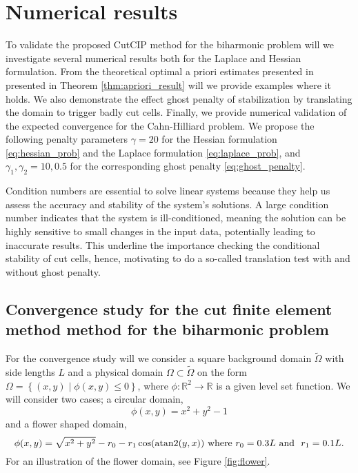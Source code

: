 
\newpage
\section{Numerical results}%
\label{sec:numerical_results}


To validate the proposed CutCIP method for the biharmonic problem will we investigate several numerical results both for the Laplace and Hessian formulation. From the theoretical optimal a priori estimates presented in presented in Theorem \ref{thm:apriori_result} will we provide examples where it holds. We also demonstrate the effect ghost penalty of stabilization by translating the domain to trigger badly cut cells. Finally, we provide numerical validation of the expected convergence for
the Cahn-Hilliard problem. We propose the following penalty parameters $\gamma = 20$ for the Hessian formulation \eqref{eq:hessian_prob} and the Laplace formulation \eqref{eq:laplace_prob}, and $\gamma _{1}, \gamma _{2} = 10, 0.5$ for the
corresponding ghost penalty \eqref{eq:ghost_penalty}.

Condition numbers are essential to solve linear systems because they help us assess the accuracy and stability of the system's solutions. A large condition number indicates that the system is ill-conditioned, meaning the solution can be highly
sensitive to small changes in the input data, potentially leading to inaccurate results. This underline the importance checking the conditional stability of cut cells, hence, motivating to do a so-called translation test with and without ghost
penalty.

\subsection{Convergence study for the cut finite element method method for the biharmonic problem  }%
\label{sub:numerical_results_for_cutcip_biharmonic_equation}
For the convergence study will we consider a square background domain $\widetilde{\Omega} $ with side lengths $L$ and a physical domain $\Omega \subset \widetilde{\Omega}$ on the form $\Omega  = \left\{ ( x,y)  \mid \phi ( x,y) \le 0    \right\} $,
where $\phi: \mathbb{R} ^2 \to \mathbb{R}  $ is a given level set function. We will consider two cases; a circular domain,
\begin{equation}
    \label{eq:circle}
\phi( x,y) = x^{ 2} + y^{2} -1
\end{equation}
and a flower shaped domain,
\begin{equation}
\label{eq:flower}
\phi ( x,y) =\sqrt{x^{2} + y^{2}} - r_{0} - r_{1}\cos(\operatorname{atan2}(y,x)) \text{ where }  r_{0} = 0.3L  \text{ and } \ r_{1} = 0.1L .
\end{equation}
For an illustration of the flower domain, see Figure \ref{fig:flower}.

